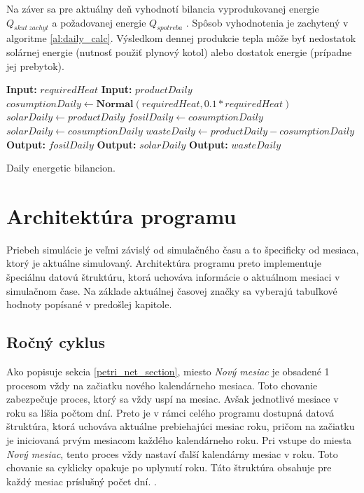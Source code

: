 \documentclass[a4paper, 11pt]{article}
\begin{document}
Na záver sa pre aktuálny deň vyhodnotí bilancia vyprodukovanej energie $Q_{skut\ zachyt}$ a požadovanej energie $Q_{spotreba}$ . Spôsob vyhodnotenia je zachytený v algoritme \ref{al:daily_calc}. Výsledkom dennej produkcie tepla môže byť nedostatok solárnej energie (nutnosť použiť plynový kotol) alebo dostatok energie (prípadne jej prebytok).

\begin{algorithm}[H]\label{al:daily_calc}
	\begin{algorithmic}
		\STATE\textbf{Input:} $requiredHeat$
		\STATE\textbf{Input:} $productDaily$
		\STATE$cosumptionDaily \gets \textbf{Normal}(requiredHeat, 0.1 * requiredHeat)$
		\STATE $solarDaily \gets productDaily$
		\STATE $fosilDaily \gets cosumptionDaily$
		\ELSE
		\STATE $solarDaily \gets cosumptionDaily$
		\STATE $wasteDaily \gets productDaily - cosumptionDaily$
		\ENDIF 
		\STATE\textbf{Output:} $fosilDaily$
		\STATE\textbf{Output:} $solarDaily$
		\STATE\textbf{Output:} $wasteDaily$
	\end{algorithmic}
	\caption{Daily energetic bilancion.}
\end{algorithm}



\section{Architektúra programu}

Priebeh simulácie je veľmi závislý od simulačného času a to špecificky od mesiaca, ktorý je aktuálne simulovaný. Architektúra programu preto implementuje špeciálnu datovú štruktúru, ktorá uchováva informácie o aktuálnom mesiaci v simulačnom čase. Na základe aktuálnej časovej značky sa vyberajú tabuľkové hodnoty popísané v predošlej kapitole.

\subsection{Ročný cyklus}
Ako popisuje sekcia \ref{petri_net_section}, miesto \textit{Nový mesiac} je obsadené 1 procesom vždy na začiatku nového kalendárneho mesiaca. Toto chovanie zabezpečuje proces, ktorý sa vždy uspí na mesiac. Avšak jednotlivé mesiace v roku sa líšia počtom dní. Preto je v rámci celého programu dostupná datová štruktúra, ktorá uchováva aktuálne prebiehajúci mesiac roku, pričom na začiatku je iniciovaná prvým mesiacom každého kalendárneho roku. Pri vstupe do miesta \textit{Nový mesiac}, tento proces vždy nastaví ďalší kalendárny mesiac v roku. Toto chovanie sa cyklicky opakuje po uplynutí roku. Táto štruktúra obsahuje pre každý mesiac príslušný počet dní. .
\end{document}
